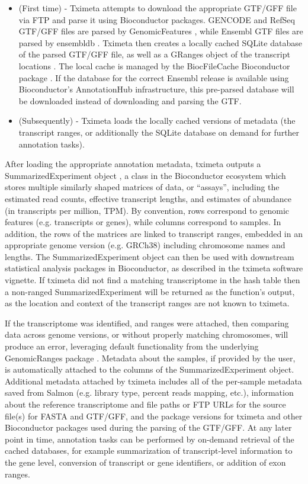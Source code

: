 \documentclass[10pt,letterpaper]{article}
\begin{document}
\begin{itemize}
\item (First time) - Tximeta attempts to download the appropriate GTF/GFF
  file via FTP and parse it using Bioconductor packages. 
  GENCODE and RefSeq GTF/GFF files are parsed
  by GenomicFeatures \cite{granges}, while Ensembl GTF files are
  parsed by ensembldb \cite{ensembldb}. Tximeta then creates a
  locally cached SQLite database of the parsed GTF/GFF file, as well as a
  GRanges object of the transcript locations \cite{granges}. The
  local cache is managed by the BiocFileCache Bioconductor package
  \cite{biocfilecache}. If the database for the correct Ensembl
    release is available using Bioconductor's AnnotationHub
    infrastructure, this pre-parsed database will be downloaded
    instead of downloading and parsing the GTF.
\item (Subsequently) - Tximeta loads the locally cached versions of
  metadata (the transcript ranges, or additionally the SQLite database
  on demand for further annotation tasks).
\end{itemize}

After loading the appropriate annotation metadata, tximeta outputs a
SummarizedExperiment object \cite{granges}, a class in the
Bioconductor ecosystem which stores multiple similarly shaped matrices
of data, or ``assays'', including the estimated read counts, effective
transcript lengths, and estimates of abundance (in transcripts per
million, TPM). By convention, rows correspond to genomic features
(e.g. transcripts or genes), while columns correspond to samples. In
addition, the rows of the matrices are linked to transcript ranges,
embedded in an appropriate genome version (e.g. GRCh38) including
chromosome names and lengths. The SummarizedExperiment object can
then be used with downstream statistical analysis packages in
Bioconductor, as described in the tximeta software vignette.
If tximeta did not find a matching transcriptome in the hash table
then a non-ranged SummarizedExperiment will be returned as the
function's output, as the location and context of the transcript
ranges are not known to tximeta.

If the transcriptome was identified, and ranges were attached, then
comparing data across genome versions, or without properly matching
chromosomes, will produce an error, leveraging default functionality
from the underlying GenomicRanges package \cite{granges}. Metadata
about the samples, if provided by the user, is automatically attached
to the columns of the SummarizedExperiment object. Additional metadata
attached by tximeta includes all of the per-sample metadata saved from
Salmon (e.g. library type, percent reads mapping, etc.), information
about the reference transcriptome and file paths or FTP URLs for the source file(s)
for FASTA and GTF/GFF, and the package versions for tximeta and other
Bioconductor packages used during the parsing of the GTF/GFF. At any
later point in time, annotation tasks can be performed by on-demand
retrieval of the cached databases, for example summarization of
transcript-level information to the gene level, conversion of
transcript or gene identifiers, or addition of exon ranges.
\end{document}
